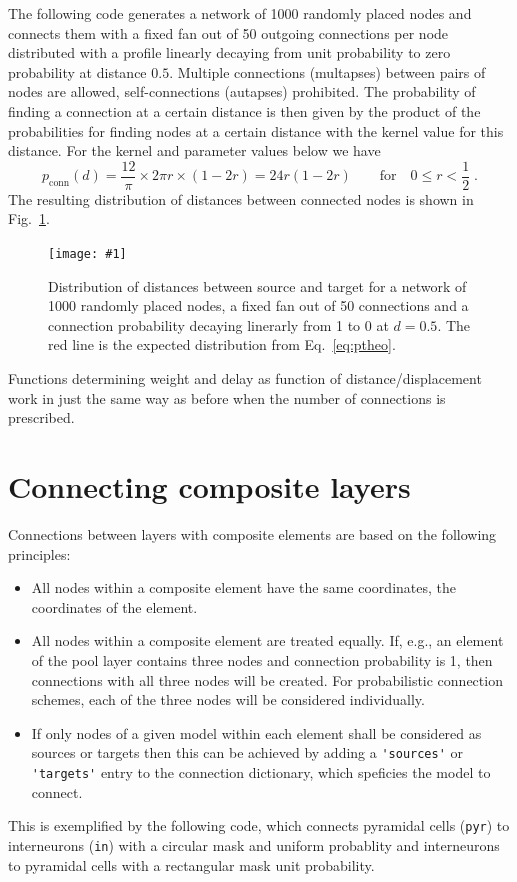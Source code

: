 \documentclass[a4paper,12pt]{report}
\newcommand{\scriptfig}[4]{%
\begin{figure}
\centerline{\texttt{[image: \#1]}}
\caption[#3]{#4}
\label{fig:#1}
\end{figure}%
}
\begin{document}
The following code generates a network of 1000 randomly placed nodes
and connects them with a fixed fan out of 50 outgoing connections per
node distributed with a profile linearly decaying from unit
probability to zero probability at distance $0.5$. Multiple
connections (multapses) between pairs of nodes are allowed,
self-connections (autapses) prohibited. The probability of finding a
connection at a certain distance is then given by the product of the
probabilities for finding nodes at a certain distance with the kernel
value for this distance. For the kernel and parameter values below we have
\begin{equation}
p_{\text{conn}}(d) = \frac{12}{\pi} \times 2\pi r \times (1-2r)
 = 24 r (1-2r) \qquad \text{for} \quad 0\le r < \frac{1}{2}\;.
\label{eq:ptheo}
\end{equation}
 The resulting
distribution of distances between connected nodes is shown in
Fig.~\ref{fig:conn6}.

\scriptfig{conn6}{0.5}{Distribution of connection distances}%
{Distribution of distances between source and target for a network of
  1000 randomly placed nodes, a fixed fan out of 50 connections and a
  connection probability decaying linerarly from 1 to 0 at
  $d=0.5$. The red line is the expected distribution from Eq.~\ref{eq:ptheo}.}

Functions determining weight and delay as function of
distance/displacement work in just the same way as before when the
number of connections is prescribed.

\section{Connecting composite layers}\label{sec:conn_composite}

Connections between layers with composite elements are based on the
following principles:
\begin{itemize}
\item All nodes within a composite element have the same
  coordinates, the coordinates of the element.
\item All nodes within a composite element are treated equally. If,
  e.g., an element of the pool layer contains three nodes and
  connection probability is 1, then connections with all three nodes
  will be created. For probabilistic connection schemes, each of the
  three nodes will be considered individually.
\item If only nodes of a given model within each element
  shall be considered as sources or targets then this can be achieved
  by adding a \lstinline!'sources'! or \lstinline!'targets'! entry to
  the connection dictionary, which speficies the model to connect.
\end{itemize}
This is exemplified by the following code, which connects pyramidal
cells (\lstinline!pyr!) to interneurons (\lstinline!in!) with a
circular mask and uniform probablity and interneurons to pyramidal
cells with a rectangular mask unit probability.

\end{document}
